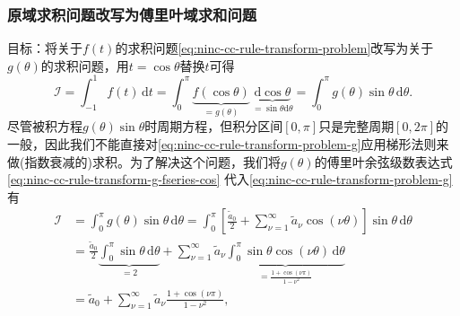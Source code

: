 \subsubsection{原域求积问题改写为傅里叶域求和问题}
\label{sec:ninc-cc-rule-transform-problem-g}
目标：将关于$f(t)$的求积问题\eqref{eq:ninc-cc-rule-transform-problem}改写为关于$g(\theta)$的求积问题，用$t = \cos \theta$替换$t$可得
\begin{equation}
  \label{eq:ninc-cc-rule-transform-problem-g}
  \mathcal{I} = \int_{-1}^{1} f(t) \, \mathrm{d} t
  = \int_{0}^{\pi}
  \underbrace{
  f \left( \cos \theta \right)
  }_{= g (\theta)}
   \, \underbrace{
  \mathrm{d} \cos \theta
  }_{= \sin \theta \mathrm{d} \theta}
  = \int_{0}^{\pi} g(\theta) \sin \theta \, \mathrm{d} \theta.
\end{equation}
尽管被积方程$g(\theta) \sin \theta$时周期方程，但积分区间$[0, \pi]$只是完整周期$[0, 2\pi]$的一般，因此我们不能直接对\eqref{eq:ninc-cc-rule-transform-problem-g}应用梯形法则来做(指数衰减的)求积。为了解决这个问题，我们将$g(\theta)$的傅里叶余弦级数表达式\eqref{eq:ninc-cc-rule-transform-g-fseries-cos}
代入\eqref{eq:ninc-cc-rule-transform-problem-g}有
\begin{equation}
  \label{eq:ninc-cc-rule-transform-problem-g-cos}
\begin{split}
    \mathcal{I} & = \int_{0}^{\pi} g(\theta) \sin \theta \, \mathrm{d} \theta
    = \int_{0}^{\pi}
    \left[
    \frac{\tilde{a}_{0}}{2} +
    \sum_{\nu = 1}^{\infty} \tilde{a}_{\nu} \cos \left( \nu \theta \right)
    \right]
    \sin \theta \, \mathrm{d} \theta \\
    & = \frac{\tilde{a}_{0}}{2}
    \underbrace{
    \int_{0}^{\pi} \sin \theta \, \mathrm{d} \theta
    }_{=2}
    + \sum_{\nu = 1}^{\infty} \tilde{a}_{\nu}
    \underbrace{
  \int_{0}^{\pi} \sin \theta \cos \left( \nu \theta \right) \, \mathrm{d} \theta
  }_{=\frac{1 + \cos \left( \nu \pi \right)}{1 - \nu^{2}}} \\
  & = \tilde{a}_{0}+
  \sum_{\nu = 1}^{\infty} \tilde{a}_{\nu} \frac{1 + \cos \left( \nu \pi \right)}{1 - \nu^{2}},
\end{split}
\end{equation}

